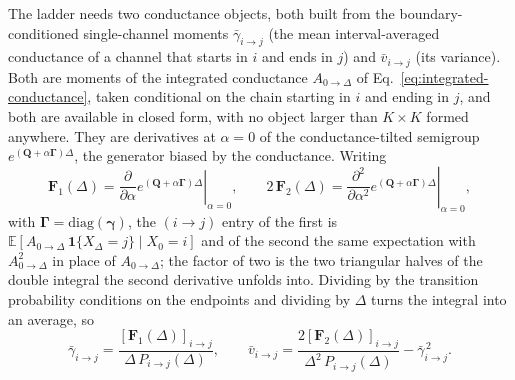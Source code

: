 \begin{appendixbox}
The ladder needs two conductance objects, both built from the boundary-conditioned
single-channel moments $\bar{\gamma}_{i\to j}$ (the mean interval-averaged
conductance of a channel that starts in $i$ and ends in $j$) and
$\bar{v}_{i\to j}$ (its variance). Both are moments of the integrated conductance
$A_{0\to\Delta}$ of Eq.~\ref{eq:integrated-conductance}, taken conditional on the chain starting
in $i$ and ending in $j$, and both are available in closed form, with no object larger
than $K\times K$ formed anywhere. They are derivatives at $\alpha=0$ of the conductance-tilted
semigroup $e^{(\mathbf{Q}+\alpha\boldsymbol{\Gamma})\Delta}$, the generator biased by the conductance.
Writing
\begin{equation}
  \mathbf{F}_1(\Delta)=\left.\frac{\partial}{\partial\alpha}
      e^{(\mathbf{Q}+\alpha\boldsymbol{\Gamma})\Delta}\right|_{\alpha=0},
  \qquad
  2\,\mathbf{F}_2(\Delta)=\left.\frac{\partial^{2}}{\partial\alpha^{2}}
      e^{(\mathbf{Q}+\alpha\boldsymbol{\Gamma})\Delta}\right|_{\alpha=0},
  \label{eq:tilted-derivatives}
\end{equation}
with $\boldsymbol{\Gamma}=\mathrm{diag}(\boldsymbol{\gamma})$, the $(i\to j)$ entry of the first is
$\mathbb{E}[A_{0\to\Delta}\,\mathbf{1}\{X_\Delta=j\}\mid X_0=i]$ and of the second the same
expectation with $A^2_{0\to\Delta}$ in place of $A_{0\to\Delta}$; the factor of two is the two
triangular halves of the double integral the second derivative unfolds into. Dividing by the
transition probability conditions on the endpoints and dividing by $\Delta$ turns the
integral into an average, so
\begin{equation}
  \bar{\gamma}_{i\to j}
    = \frac{[\mathbf{F}_1(\Delta)]_{i\to j}}{\Delta\,P_{i\to j}(\Delta)},
  \qquad
  \bar{v}_{i\to j}
    = \frac{2[\mathbf{F}_2(\Delta)]_{i\to j}}{\Delta^2\,P_{i\to j}(\Delta)}
      - \bar{\gamma}^{\,2}_{i\to j}.
  \label{eq:gammabar-vbar}
\end{equation}


\end{appendixbox}
